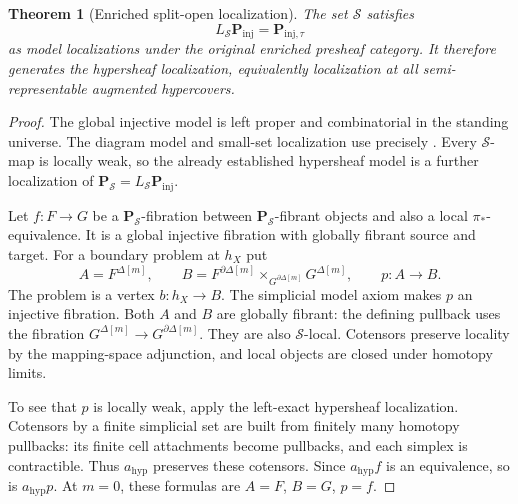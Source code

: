 \documentclass[12pt]{amsart}
\newtheorem{thm}{Theorem}[section]
\theoremstyle{definition}
\theoremstyle{remark}
\numberwithin{equation}{section}
\begin{document}
\begin{thm}[Enriched split-open localization]
The set $\mathscr S$ satisfies
\[
 L_{\mathscr S}\mathbf P_{\mathrm{inj}}
       =\mathbf P_{\mathrm{inj},\tau}
\]
as model localizations under the original enriched
presheaf category.
\label{lem:banach-split-open-localization}
It therefore generates the hypersheaf localization,
equivalently localization at all semi-representable
augmented hypercovers.
\end{thm}

\begin{proof}
The global injective model is left proper and
combinatorial in the standing universe. The diagram
model and small-set localization use precisely
\cite[Proposition~A.1.3, Theorems~A.2.2 and~A.2.4,
and Proposition~A.2.5, PDF leaves~68--69]{HAGI2005}.
Every $\mathscr S$-map is locally weak, so the
already established hypersheaf model is a further
localization of $\mathbf P_{\mathscr S}
=L_{\mathscr S}\mathbf P_{\mathrm{inj}}$.

Let $f:F\to G$ be a $\mathbf P_{\mathscr S}$-fibration
between $\mathbf P_{\mathscr S}$-fibrant objects
and also a local $\pi_*$-equivalence. It is a
global injective fibration with globally fibrant
source and target. For a boundary problem at $h_X$
put
\[
 A=F^{\Delta[m]},\qquad
 B=F^{\partial\Delta[m]}
       \times_{G^{\partial\Delta[m]}}G^{\Delta[m]},
 \qquad p:A\to B.
\]
The problem is a vertex $b:h_X\to B$.
The simplicial model axiom makes $p$ an injective
fibration. Both $A$ and $B$ are globally fibrant:
the defining pullback uses the fibration
$G^{\Delta[m]}\to G^{\partial\Delta[m]}$.
They are also $\mathscr S$-local. Cotensors
preserve locality by the mapping-space adjunction,
and local objects are closed under homotopy limits.

To see that $p$ is locally weak, apply the left-exact
hypersheaf localization. Cotensors by a finite
simplicial set are built from finitely many
homotopy pullbacks: its finite cell attachments
become pullbacks, and each simplex is contractible.
Thus $a_{\mathrm{hyp}}$ preserves these cotensors.
Since $a_{\mathrm{hyp}}f$ is an equivalence,
so is $a_{\mathrm{hyp}}p$.
At $m=0$, these formulas are $A=F$, $B=G$, $p=f$.


\end{proof}
\end{document}
